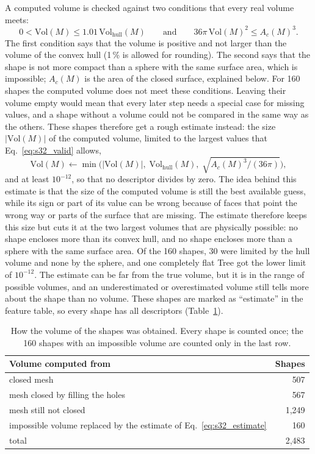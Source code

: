 \documentclass[10pt,a4paper]{article}
\begin{document}
A computed volume is checked against two conditions that every real volume meets:
\begin{equation}
0<\mathrm{Vol}(M)\le 1.01\,\mathrm{Vol}_{\mathrm{hull}}(M)\qquad\text{and}\qquad 36\pi\,\mathrm{Vol}(M)^2\le A_c(M)^3 .
\label{eq:s32_valid}
\end{equation}
The first condition says that the volume is positive and not larger than the volume of the convex hull (1\,\% is allowed for
rounding). The second says that the shape is not more compact than a sphere with the same surface area, which is impossible;
$A_c(M)$ is the area of the closed surface, explained below. For 160 shapes the computed volume does not meet these conditions.
Leaving their volume empty would mean that every later step needs a special case for missing values, and a shape without a
volume could not be compared in the same way as the others. These shapes therefore get a rough estimate instead: the size
$\lvert\mathrm{Vol}(M)\rvert$ of the computed volume, limited to the largest values that Eq.~\eqref{eq:s32_valid} allows,
\begin{equation}
\mathrm{Vol}(M)\leftarrow\min\Big(\lvert\mathrm{Vol}(M)\rvert,\;\mathrm{Vol}_{\mathrm{hull}}(M),\;\sqrt{A_c(M)^3/(36\pi)}\Big),
\label{eq:s32_estimate}
\end{equation}
and at least $10^{-12}$, so that no descriptor divides by zero. The idea behind this estimate is that the size of the computed
volume is still the best available guess, while its sign or part of its value can be wrong because of faces that point the
wrong way or parts of the surface that are missing. The estimate therefore keeps this size but cuts it at the two largest
volumes that are physically possible: no shape encloses more than its convex hull, and no shape encloses more than a sphere with
the same surface area. Of the 160 shapes, 30 were limited by the hull volume and none by the sphere, and one completely flat
Tree got the lower limit of $10^{-12}$. The estimate can be far from the true volume, but it is in the
range of possible volumes, and an underestimated or overestimated volume still tells more about the shape than no volume. These
shapes are marked as ``estimate'' in the feature table, so every shape has all descriptors (Table~\ref{tab:s32_volume}).

\begin{table}[htbp]\centering\small
\begin{tabular}{@{}lr@{}}\toprule
Volume computed from & Shapes\\\midrule
closed mesh & 507\\
mesh closed by filling the holes & 567\\
mesh still not closed & 1,249\\
impossible volume replaced by the estimate of Eq.~\eqref{eq:s32_estimate} & 160\\\midrule
total & 2,483\\
\bottomrule\end{tabular}
\caption{How the volume of the shapes was obtained. Every shape is counted once; the 160 shapes with an impossible volume
are counted only in the last row.}
\label{tab:s32_volume}
\end{table}
\end{document}
